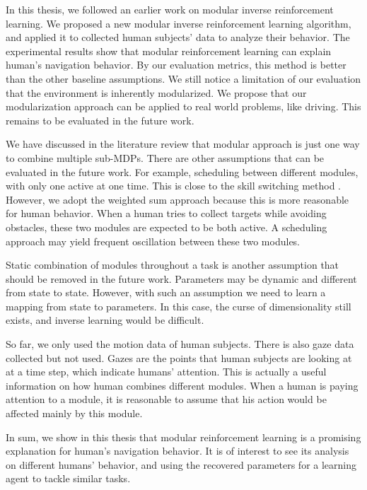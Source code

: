 In this thesis, we followed an earlier work on modular inverse reinforcement
learning. We proposed a new modular inverse reinforcement
learning algorithm, and applied it to collected human subjects' data to analyze
their behavior.
The experimental results show that modular reinforcement learning can explain
human's navigation behavior. By our evaluation metrics, this method is better
than the other baseline assumptions.
We still notice a limitation of our evaluation that the environment is
inherently modularized. We propose that our modularization approach can be
applied to real world problems, like driving. This remains to be evaluated in
the future work.

We have discussed in the literature review that modular approach is just one way to combine multiple
sub-MDPs. There are other assumptions that can be evaluated in the future work.
For example, scheduling between
different modules, with only one active at one time. This is close to the skill
switching method \cite{konidaris2009skill}. However, we adopt the
weighted sum approach because this is more reasonable for human behavior. When a
human tries to collect targets while avoiding obstacles, these two modules are
expected to be both active. A scheduling approach may yield frequent oscillation
between these two modules.

Static combination of modules throughout a task is another assumption that
should be removed in the future work. Parameters may be dynamic and different from
state to state.  However, with such an assumption we need to learn a mapping
from state to parameters. In this case, the curse of dimensionality still exists,
and inverse learning would be difficult.

So far, we only used the motion data of human subjects. There is also gaze data
collected but not used. Gazes are the points that human subjects are looking at
at a time step, which indicate humans' attention. This is actually a useful
information on how human combines different modules. When a human is paying
attention to a module, it is reasonable to assume that his action would be
affected mainly by this module.

In sum, we show in this thesis that modular reinforcement learning is a
promising explanation for human's navigation behavior. It is of interest to see
its analysis on different humans' behavior, and using the recovered parameters
for a learning agent to tackle similar tasks.
